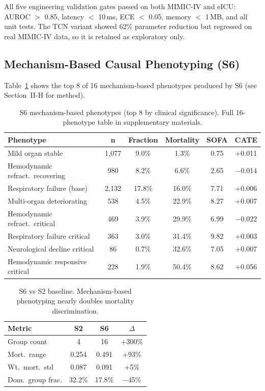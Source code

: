 \documentclass[conference,a4paper]{IEEEtran}
\begin{document}
All five engineering validation gates passed on both MIMIC-IV and eICU: AUROC $>$ 0.85, latency $<$ 10\,ms, ECE $<$ 0.05, memory $<$ 1\,MB, and all unit tests. The TCN variant showed 62\% parameter reduction but regressed on real MIMIC-IV data, so it is retained as exploratory only.


\subsection{Mechanism-Based Causal Phenotyping (S6)}

Table~\ref{tab:s6} shows the top 8 of 16 mechanism-based phenotypes produced by S6 (see Section~II-H for method).

\begin{table}[t]
\centering
\caption{S6 mechanism-based phenotypes (top 8 by clinical significance). Full 16-phenotype table in supplementary materials.}
\label{tab:s6}
\small
\begin{tabular}{lccccc}
\toprule
\textbf{Phenotype} & \textbf{n} & \textbf{Fraction} & \textbf{Mortality} & \textbf{SOFA} & \textbf{CATE} \\
\midrule
Mild organ stable & 1,077 & 9.0\% & 1.3\% & 0.75 & +0.011 \\
Hemodynamic refract.\ recovering & 980 & 8.2\% & 6.6\% & 2.65 & $-$0.014 \\
Respiratory failure (base) & 2,132 & 17.8\% & 16.0\% & 7.71 & +0.006 \\
Multi-organ deteriorating & 538 & 4.5\% & 22.9\% & 8.27 & +0.007 \\
Hemodynamic refract.\ critical & 469 & 3.9\% & 29.9\% & 6.99 & $-$0.022 \\
Respiratory failure critical & 363 & 3.0\% & 31.4\% & 9.82 & +0.003 \\
Neurological decline critical & 86 & 0.7\% & 32.6\% & 7.05 & +0.007 \\
Hemodynamic responsive critical & 228 & 1.9\% & 50.4\% & 8.62 & +0.056 \\
\bottomrule
\end{tabular}
\end{table}

\begin{table}[t]
\centering
\caption{S6 vs S2 baseline. Mechanism-based phenotyping nearly doubles mortality discrimination.}
\label{tab:s6_baseline}
\small
\begin{tabular}{lccc}
\toprule
\textbf{Metric} & \textbf{S2} & \textbf{S6} & \textbf{$\Delta$} \\
\midrule
Group count & 4 & 16 & +300\% \\
Mort.\ range & 0.254 & 0.491 & +93\% \\
Wt.\ mort.\ std & 0.087 & 0.091 & +5\% \\
Dom.\ group frac. & 32.2\% & 17.8\% & $-$45\% \\
\bottomrule
\end{tabular}
\end{table}
\end{document}
